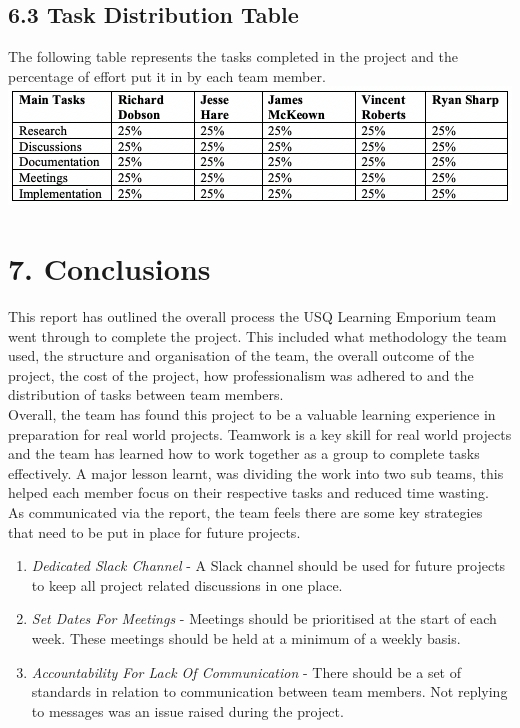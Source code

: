 \documentclass[11pt]{article}
\begin{document}
\subsection{6.3 Task Distribution Table}
The following table represents the tasks completed in the project and the percentage of effort put it in by each team member. \\

\includegraphics[scale=0.71]{task_distro.png} \\

\newpage



\section{7. Conclusions}
This report has outlined the overall process the USQ Learning Emporium team went through to complete the project. This included what methodology the team used, the structure and organisation of the team, the overall outcome of the project, the cost of the project, how professionalism was adhered to and the distribution of tasks between team members. \\

Overall, the team has found this project to be a valuable learning experience in preparation for real world projects. Teamwork is a key skill for real world projects and the team has learned how to work together as a group to complete tasks effectively. A major lesson learnt, was dividing the work into two sub teams, this helped each member focus on their respective tasks and reduced time wasting. \\

As communicated via the report, the team feels there are some key strategies that need to be put in place for future projects.

\begin{enumerate}
\item \textit{Dedicated Slack Channel} - A Slack channel should be used for future projects to keep all project related discussions in one place.
\item \textit{Set Dates For Meetings} - Meetings should be prioritised at the start of each week. These meetings should be held at a minimum of a weekly basis.
\item \textit{Accountability For Lack Of Communication} - There should be a set of standards in relation to communication between team members. Not replying to messages was an issue raised during the project.
\end{enumerate} 
\end{document}
